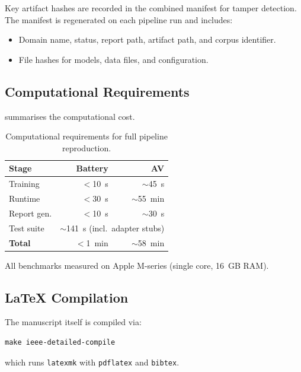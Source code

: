 Key artifact hashes are recorded in the combined manifest for tamper detection.
The manifest is regenerated on each pipeline run and includes:
\begin{itemize}[nosep]
  \item Domain name, status, report path, artifact path, and corpus identifier.
  \item File hashes for models, data files, and configuration.
\end{itemize}

\subsection{Computational Requirements}

 summarises the computational cost.

\begin{table}[h]
\caption{Computational requirements for full pipeline reproduction.}
\label{tab:compute}
\centering\small
\begin{tabular}{lrr}
\toprule
\textbf{Stage} & \textbf{Battery} & \textbf{AV} \\
\midrule
Training         & $<$10~s     & $\sim$45~s \\
Runtime          & $<$30~s     & $\sim$55~min \\
Report gen.      & $<$10~s     & $\sim$30~s \\
Test suite       & \multicolumn{2}{c}{$\sim$141~s (incl.\ adapter stubs)} \\
\midrule
\textbf{Total}   & $<$1~min    & $\sim$58~min \\
\bottomrule
\end{tabular}
\end{table}

All benchmarks measured on Apple M-series (single core, 16~GB RAM).

\subsection{LaTeX Compilation}

The manuscript itself is compiled via:
\begin{verbatim}
make ieee-detailed-compile
\end{verbatim}
which runs \texttt{latexmk} with \texttt{pdflatex} and \texttt{bibtex}.
